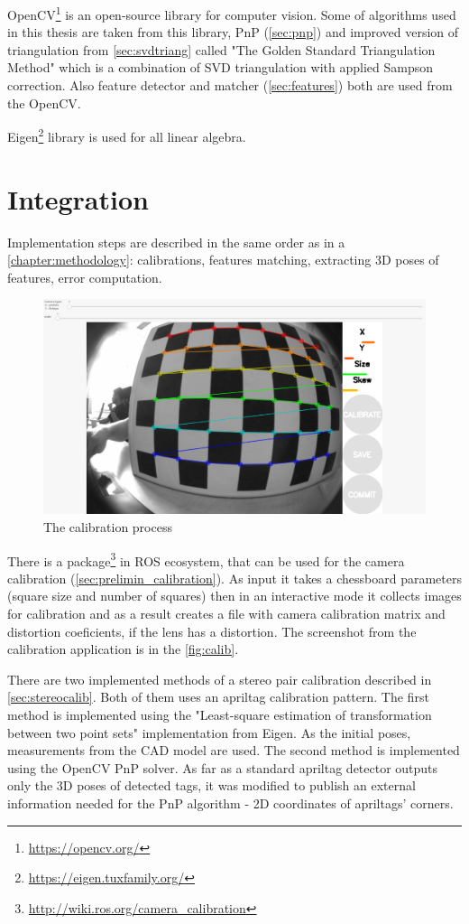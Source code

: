 OpenCV\footnote{\url{https://opencv.org/}} is an open-source library for computer vision.
Some of algorithms used in this thesis are taken from this library, PnP (\autoref{sec:pnp}) and improved version of triangulation from \autoref{sec:svdtriang} called "The Golden Standard Triangulation Method" which is a combination of SVD triangulation with applied Sampson correction.
Also feature detector and matcher (\autoref{sec:features}) both are used from the OpenCV.

Eigen\footnote{\url{https://eigen.tuxfamily.org/}} library is used for all linear algebra. 

\section{Integration}
\label{sec:impl_integration}

Implementation steps are described in the same order as in a \autoref{chapter:methodology}: calibrations, features matching, extracting 3D poses of features, error computation.

\begin{figure}[h]
    \centering
    \includegraphics[width=.6\textwidth]{graphics/calibration.png}
    \caption{The calibration process}
    \label{fig:calib}
\end{figure}

There is a package\footnote{\url{http://wiki.ros.org/camera_calibration}} in ROS ecosystem, that can be used for the camera calibration (\autoref{sec:prelimin_calibration}). 
As input it takes a chessboard parameters (square size and number of squares) then in an interactive mode it collects images for calibration and as a result creates a file with camera calibration matrix and distortion coeficients, if the lens has a distortion.
The screenshot from the calibration application is in the \autoref{fig:calib}.

There are two implemented methods of a stereo pair calibration described in \autoref{sec:stereocalib}.
Both of them uses an apriltag calibration pattern.
The first method is implemented using the "Least-square estimation of transformation between two point sets" \cite{Umeyama1991} implementation from Eigen.
As the initial poses, measurements from the CAD model are used.
The second method is implemented using the OpenCV PnP solver.
As far as a standard apriltag detector outputs only the 3D poses of detected tags, it was modified to publish an external information needed for the PnP algorithm - 2D coordinates of apriltags' corners.




